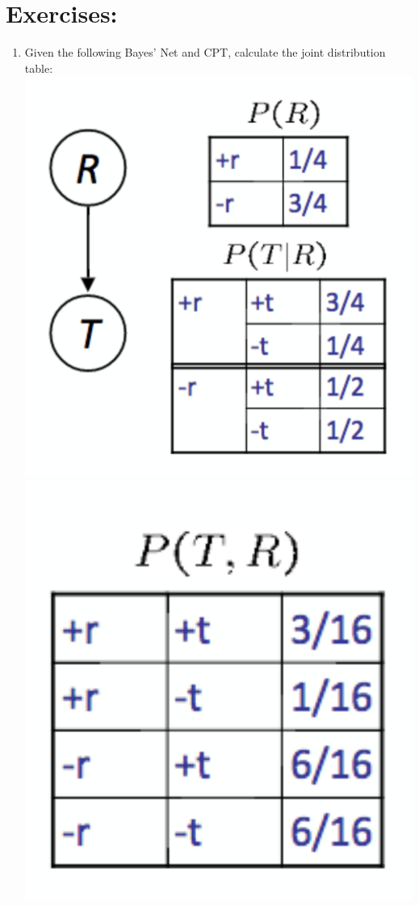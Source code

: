 \documentclass[11pt]{article}
\newif\ifsol
\begin{document}
\section*{Exercises:}
\begin{enumerate}
    \item Given the following Bayes' Net and CPT, calculate the joint distribution table:\\
    \includegraphics[scale=0.25]{figs/conditional.png} \quad \quad \quad \quad \quad \quad
    \ifsol
        \includegraphics[scale=0.25]{figs/joint.png}

\end{enumerate}
\end{document}
